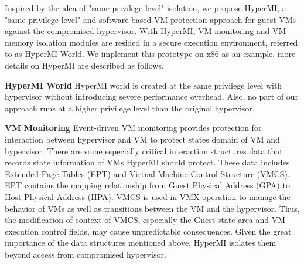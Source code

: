 \documentclass[conference]{IEEEtran}
\begin{document}
Inspired by the idea of "same privilege-level" isolation, we propose HyperMI, a "same privilege-level" and software-based VM protection approach for guest VMs against the compromised hypervisor. 
With HyperMI, VM monitoring and VM memory isolation modules are resided in a secure execution environment, referred to as HyperMI World.
We implement this prototype on x86 as an example, more details on HyperMI are described as follows.

\textbf{HyperMI World}
HyperMI world is created at the same privilege level with hypervisor without introducing severe performance overhead. Also, no part of our approach runs at a higher privilege level than the original hypervisor.


\textbf{VM Monitoring}
Event-driven VM monitoring provides protection for interaction between hypervisor and VM to protect states domain of VM and hypervisor.
There are some especially critical interaction structures data that records state information of VMs HyperMI should protect. These data includes Extended Page Tables (EPT) and Virtual Machine Control Structure (VMCS). EPT contains the mapping relationship from Guest Physical Address (GPA) to Host Physical Address (HPA). 
VMCS is used in VMX operation to manage the behavior of VMs as well as transitions between the VM and the hypervisor. Thus, the modification of context of VMCS, especially the Guest-state area and VM-execution control fields, may cause unpredictable consequences. %
Given the great importance of the data structures mentioned above, HyperMI isolates them beyond access from compromised hypervisor.
\end{document}
